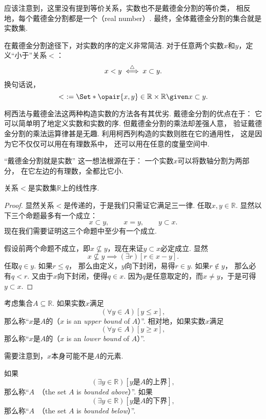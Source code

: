 应该注意到，这里没有提到等价关系，实数也不是戴德金分割的等价类，
相反地，每个戴德金分割都是一个（real number）.
最终，全体戴德金分割的集合就是实数集.

在戴德金分割途径下，对实数的序的定义非常简洁.
对于任意两个实数\(x\)和\(y\)，定义“小于”关系\(<\)：\[
	x < y \overset{\triangle}{\iff} x \subset y.
\]
换句话说，\[
	<\ \defeq \Set*{ \opair{x,y}\in\mathbb{R}\times\mathbb{R} \given x \subset y }.
\]

柯西法与戴德金法这两种构造实数的方法各有其优劣.
戴德金分割的优点在于：
它可以简单明了地定义实数和实数的序.
但戴德金分割的乘法却差强人意，
验证戴德金分割的乘法运算律甚是无趣.
利用柯西列构造的实数则胜在它的通用性，
这是因为它不仅仅可以用在有理数系中，
还可以用在任意的度量空间中.

“戴德金分割就是实数”
这一想法根源在于：
一个实数\(x\)可以将数轴分割为两部分，
在它左边的有理数，全都比它小.

\begin{theorem}
关系\(<\)是实数集\(\mathbb{R}\)上的线性序.
\begin{proof}
显然关系\(<\)是传递的，于是我们只需证它满足三一律.
任取\(x,y\in\mathbb{R}\).
显然以下三个命题最多有一个成立：\[
	x \subset y, \qquad
	x = y, \qquad
	y \subset x.
\]
现在我们需要证明这三个命题中至少有一个成立.

假设前两个命题不成立，即\(x \nsubseteq y\)，现在来证\(y \subset x\)必定成立.
显然\[
	x \nsubseteq y
	\implies
	(\exists r)[r \in x-y].
\]
任取\(q \in y\).
如果\(r \leq q\)，
那么由定义，\(y\)向下封闭，易得\(r \in y\).
如果\(r \notin y\)，
那么必有\(q < r\).
又由于\(x\)向下封闭，便得\(q \in x\).
因为\(q\)是任意取定的，而\(x \neq y\)，于是可得\(y \subset x\).
\end{proof}
\end{theorem}

考虑集合\(A \subseteq \mathbb{R}\).
如果实数\(x\)满足\[
	(\forall y \in A)[y \leq x],
\]
那么称“\(x\)是\(A\)的（\(x\) is an \emph{upper bound} of \(A\)）”.
相对地，如果实数\(x\)满足\[
	(\forall y \in A)[y \geq x],
\]
那么称“\(x\)是\(A\)的（\(x\) is an \emph{lower bound} of \(A\)）”.

需要注意到，\(x\)本身可能不是\(A\)的元素.

如果\[
	(\exists y\in\mathbb{R})
	[\text{\(y\)是\(A\)的上界}],
\]
那么称“\(A\)~（the set \(A\) is \emph{bounded above}）”.
如果\[
	(\exists y\in\mathbb{R})
	[\text{\(y\)是\(A\)的下界}],
\]
那么称“\(A\)~（the set \(A\) is \emph{bounded below}）”.

